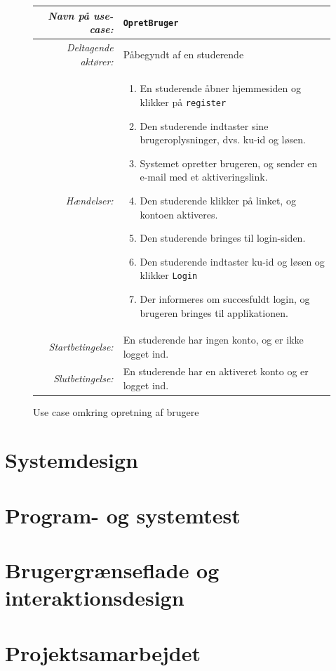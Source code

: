 \documentclass[12pt]{article}
\begin{document}
\begin{figure}[htpb]
    \centering
    \begin{tabular}{r p{10cm}}
        \toprule
        \textit{Navn på use-case:} & \verb!OpretBruger! \\
        \hline
        \textit{Deltagende aktører:} & Påbegyndt af en studerende \\
        \hline
        \textit{Hændelser:} & \begin{enumerate}[nolistsep]
            \item En studerende åbner hjemmesiden og klikker på \verb!register!
            \item Den studerende indtaster sine brugeroplysninger, dvs. ku-id og løsen.
            \item Systemet opretter brugeren, og sender en e-mail med et aktiveringslink.
            \item Den studerende klikker på linket, og kontoen aktiveres.
            \item Den studerende bringes til login-siden.
            \item Den studerende indtaster ku-id og løsen og klikker \verb!Login!
            \item Der informeres om succesfuldt login, og brugeren bringes til applikationen.
        \end{enumerate}  \\
        \hline
        \textit{Startbetingelse:} & En studerende har ingen konto, og er ikke logget ind. \\
        \hline
        \textit{Slutbetingelse:} & En studerende har en aktiveret konto og er logget ind. \\
        \bottomrule
    \end{tabular}
    \caption{Use case omkring opretning af brugere}
    \label{fig:use_case1}
\end{figure}

\section{Systemdesign}
\label{sec:systemdesign}

\section{Program- og systemtest}
\label{sec:program_og_systemtest}

\section{Brugergrænseflade og interaktionsdesign}

\section{Projektsamarbejdet}
\label{sec:projektsamarbejdet}

{}
\end{document}

